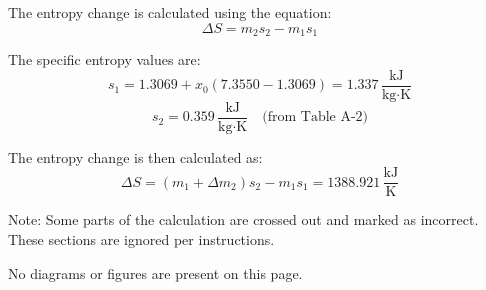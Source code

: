 The entropy change is calculated using the equation:  
\[
\Delta S = m_2 s_2 - m_1 s_1
\]  

The specific entropy values are:  
\[
s_1 = 1.3069 + x_0 (7.3550 - 1.3069) = 1.337 \, \frac{\text{kJ}}{\text{kg·K}}
\]  
\[
s_2 = 0.359 \, \frac{\text{kJ}}{\text{kg·K}} \quad \text{(from Table A-2)}
\]  

The entropy change is then calculated as:  
\[
\Delta S = (m_1 + \Delta m_2) s_2 - m_1 s_1 = 1388.921 \, \frac{\text{kJ}}{\text{K}}
\]  

Note: Some parts of the calculation are crossed out and marked as incorrect. These sections are ignored per instructions.  

No diagrams or figures are present on this page.